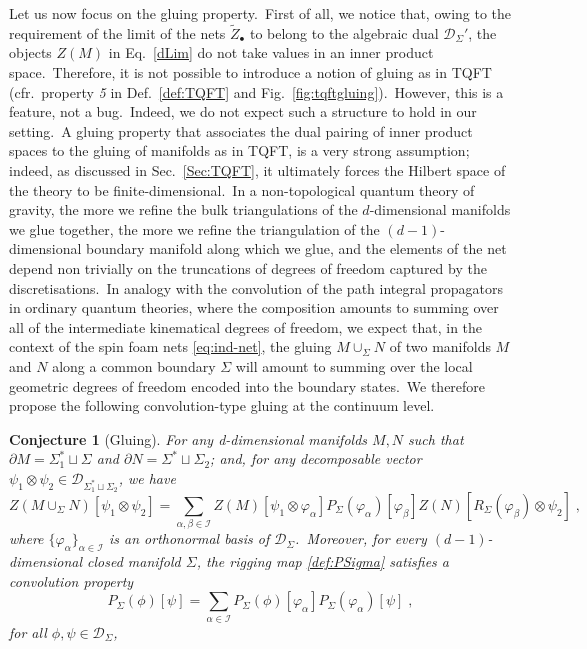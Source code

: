 \documentclass[11pt]{article}
\newcommand{\be}{\begin{equation}}
\newcommand{\ee}{\end{equation}}
\newcommand{\cD}{\mathcal{D}}
\newtheorem{conjecture}[proposition]{Conjecture}
\theoremstyle{definition}
\numberwithin{equation}{section}
\begin{document}
Let us now focus on the gluing property.~First of all, we notice that, owing to the requirement of the limit of the nets $\tilde{Z}_{\bullet}$ to belong to the algebraic dual $\cD_{\Sigma}'$, the objects $Z(M)$ in Eq.~\eqref{dLim} do not take values in an inner product space.~Therefore, it is not possible to introduce a notion of gluing as in TQFT (cfr.~property \emph{5} in Def.~\ref{def:TQFT} and Fig.~\ref{fig:tqftgluing}).~However, this is a feature, not a bug.~Indeed, we do not expect such a structure to hold in our setting.~A gluing property that associates the dual pairing of inner product spaces to the gluing of manifolds as in TQFT, is a very strong assumption; indeed, as discussed in Sec.~\ref{Sec:TQFT}, it ultimately forces the Hilbert space of the theory to be finite-dimensional.~In a non-topological quantum theory of gravity, the more we refine the bulk triangulations of the $d$-dimensional manifolds we glue together, the more we refine the triangulation of the $(d-1)$-dimensional boundary manifold along which we glue, and the elements of the net depend non trivially on the truncations of degrees of freedom captured by the discretisations.~In analogy with the convolution of the path integral propagators in ordinary quantum theories, where the composition amounts to summing over all of the intermediate kinematical degrees of freedom, we expect that, in the context of the spin foam nets \eqref{eq:ind-net}, the gluing $M\cup_{\Sigma}N$ of two manifolds $M$ and $N$ along a common boundary $\Sigma$ will amount to summing over the local geometric degrees of freedom encoded into the boundary states.~We therefore propose the following convolution-type gluing at the continuum level.
\begin{conjecture}[Gluing]\label{conj:gluing}
    For any d-dimensional manifolds $M,N$ such that $\partial M=\Sigma_1^*\sqcup \Sigma$ and $\partial N=\Sigma^*\sqcup \Sigma_2$; and, for any decomposable vector $\psi_1\otimes \psi_2\in\mathcal{D}_{\Sigma_1^*\sqcup\Sigma_2}$, we have
    \begin{equation}\label{eq:ZPZgluingconv}
        Z(M\cup_\Sigma N)[\psi_1\otimes\psi_2]=\sum_{\alpha,\beta\in\mathscr I}Z(M)[\psi_1\otimes \varphi_\alpha]P_{\Sigma}(\varphi_\alpha)[\varphi_\beta]Z(N)[R_\Sigma(\varphi_\beta)\otimes\psi_2]\;,
    \end{equation}
    where $\{\varphi_\alpha\}_{\alpha\in\mathscr I}$ is an orthonormal basis of $\mathcal{D}_{\Sigma}$.~Moreover, for every $(d-1)$-dimensional closed manifold $\Sigma$, the rigging map \eqref{def:PSigma} satisfies a convolution property
    \be\label{eq:PSigmaconvolution}
    P_{\Sigma}(\phi)[\psi]=\sum_{\alpha\in\mathscr I}P_{\Sigma}(\phi)[\varphi_\alpha]P_{\Sigma}(\varphi_\alpha)[\psi]\;,
    \ee
    for all $\phi,\psi\in\cD_{\Sigma}$,
\end{conjecture}
\end{document}
